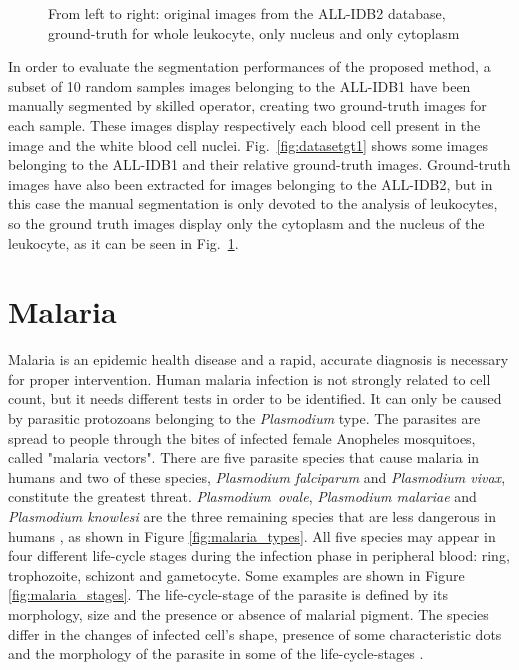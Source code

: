 \documentclass[final,a4paper,12pt,english]{UnicaPhdThesis3}
\begin{document}
\begin{figure}[!htbp]
\centering
\hspace{12.5mm}
% 
\caption{\label{fig:datasetgt2}From left to right: original images from the ALL-IDB2 database, ground-truth for whole leukocyte, only nucleus and only cytoplasm}
\end{figure}

In order to evaluate the segmentation performances of the proposed method, a subset of 10 random samples images belonging to the ALL-IDB1 have been manually segmented by skilled operator, creating two ground-truth images for each sample. These images display respectively each blood cell present in the image and the white blood cell nuclei. Fig.~\ref{fig:datasetgt1} shows some images belonging to the ALL-IDB1 and their relative ground-truth images. Ground-truth images have also been extracted for images belonging to the ALL-IDB2, but in this case the manual segmentation is only devoted to the analysis of leukocytes, so the ground truth images display only the cytoplasm and the nucleus of the leukocyte, as it can be seen in Fig.~\ref{fig:datasetgt2}.

\section{Malaria}
Malaria is an epidemic health disease and a rapid, accurate diagnosis is necessary for proper intervention. 
Human malaria infection is not strongly related to cell count, but it needs different tests in order to be identified. It can only be caused by parasitic protozoans belonging to the \emph{Plasmodium} type. The parasites are spread to people through the bites of infected female Anopheles mosquitoes, called "malaria vectors".
There are five parasite species that cause malaria in humans and two of these species, \emph{Plasmodium falciparum} and \emph{Plasmodium vivax}, constitute the greatest threat. \emph{Plasmodium~ovale}, \emph{Plasmodium malariae} and \emph{Plasmodium knowlesi} are the three remaining species that are less dangerous in humans \cite{WHO_dec_2016}, as shown in Figure \ref{fig:malaria_types}.
All five species may appear in four different life-cycle stages during the infection phase in peripheral blood: ring, trophozoite, schizont and gametocyte. Some examples are shown in Figure \ref{fig:malaria_stages}.
The life-cycle-stage of the parasite is defined by its morphology, size and the presence or absence of malarial pigment.
The species differ in the changes of infected cell's shape, presence of some characteristic dots and the morphology of the parasite in some of the life-cycle-stages \cite{Somasekar2011}.
\end{document}
